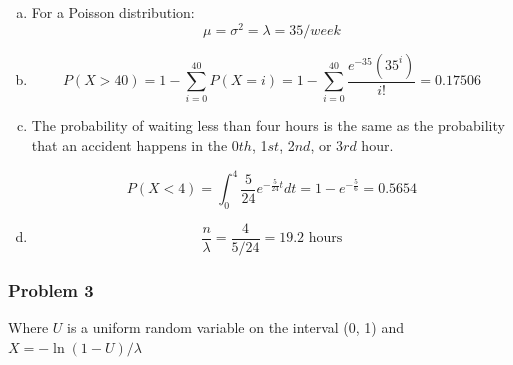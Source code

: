 \documentclass[11pt]{extarticle}
\begin{document}
\begin{enumerate}[(a)]
\item  For a Poisson distribution: $$\mu = \sigma^2 = \lambda = 35/week $$


\item $$P(X > 40) = 1 - \sum_{i=0}^{40} P(X = i) = 1 - \sum_{i=0}^{40} \frac{e^{-35}(35^i)}{i!} = \boxed{0.17506}$$



\item The probability of waiting less than four hours is the same as the probability that an accident happens in the 0$th$, 1$st$, 2$nd$, or 3$rd$ hour.








 $$ P(X < 4) = \int_{0}^4 \frac{5}{24} e^{-\frac{5}{24}t} dt = 1-e^{-\frac{5}{6}} = \boxed{0.5654}$$
 



\item $$ \frac{n}{\lambda} = \frac{4}{5/24} = \boxed{19.2 \text{\ hours}} $$

\end{enumerate}
 
\subsubsection*{Problem 3}

Where $U$ is a uniform random variable on the interval (0, 1) and $ X = -\ln(1-U)/\lambda $
\end{document}
